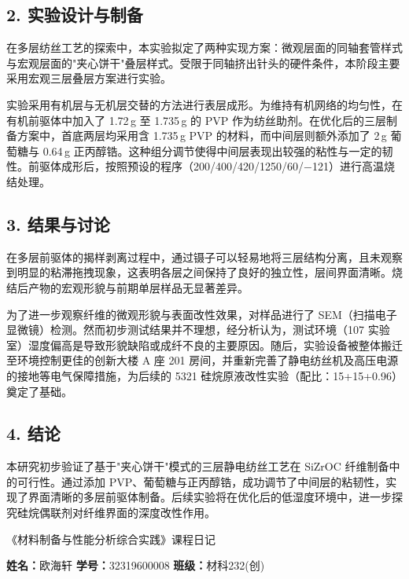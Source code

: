 \documentclass[a4paper, 12pt]{ctexart}
\begin{document}
\subsection*{2. 实验设计与制备}
在多层纺丝工艺的探索中，本实验拟定了两种实现方案：微观层面的同轴套管样式与宏观层面的"夹心饼干"叠层样式。受限于同轴挤出针头的硬件条件，本阶段主要采用宏观三层叠层方案进行实验。

实验采用有机层与无机层交替的方法进行表层成形。为维持有机网络的均匀性，在有机前驱体中加入了 1.72\,g 至 1.735\,g 的 PVP 作为纺丝助剂。在优化后的三层制备方案中，首底两层均采用含 1.735\,g PVP 的材料，而中间层则额外添加了 2\,g 葡萄糖与 0.64\,g 正丙醇锆。这种组分调节使得中间层表现出较强的粘性与一定的韧性。前驱体成形后，按照预设的程序（200/400/420/1250/60/−121）进行高温烧结处理。

\subsection*{3. 结果与讨论}
在多层前驱体的揭样剥离过程中，通过镊子可以轻易地将三层结构分离，且未观察到明显的粘滞拖拽现象，这表明各层之间保持了良好的独立性，层间界面清晰。烧结后产物的宏观形貌与前期单层样品无显著差异。

为了进一步观察纤维的微观形貌与表面改性效果，对样品进行了 SEM（扫描电子显微镜）检测。然而初步测试结果并不理想，经分析认为，测试环境（107 实验室）湿度偏高是导致形貌缺陷或成纤不良的主要原因。随后，实验设备被整体搬迁至环境控制更佳的创新大楼 A 座 201 房间，并重新完善了静电纺丝机及高压电源的接地等电气保障措施，为后续的 5321 硅烷原液改性实验（配比：15+15+0.96）奠定了基础。

\subsection*{4. 结论}
本研究初步验证了基于"夹心饼干"模式的三层静电纺丝工艺在 SiZrOC 纤维制备中的可行性。通过添加 PVP、葡萄糖与正丙醇锆，成功调节了中间层的粘韧性，实现了界面清晰的多层前驱体制备。后续实验将在优化后的低湿度环境中，进一步探究硅烷偶联剂对纤维界面的深度改性作用。

\newpage

\begin{center}
    { \heiti 《材料制备与性能分析综合实践》课程日记}
\end{center}
\vspace{0.5cm}

\noindent
\textbf{姓名：}欧海轩 \hfill \textbf{学号：}32319600008 \hfill \textbf{班级：}材科232(创)
\vspace{1cm}
\end{document}
